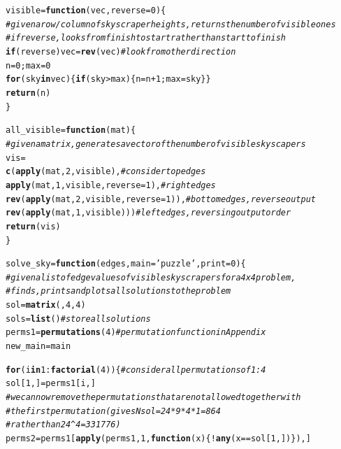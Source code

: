 \documentclass[12pt]{article}\usepackage[]{graphicx}\usepackage[]{color}
\makeatletter
\newcommand{\hlnum}[1]{\textcolor[rgb]{0.686,0.059,0.569}{#1}}%
\newcommand{\hlstr}[1]{\textcolor[rgb]{0.192,0.494,0.8}{#1}}%
\newcommand{\hlcom}[1]{\textcolor[rgb]{0.678,0.584,0.686}{\textit{#1}}}%
\newcommand{\hlopt}[1]{\textcolor[rgb]{0,0,0}{#1}}%
\newcommand{\hlstd}[1]{\textcolor[rgb]{0.345,0.345,0.345}{#1}}%
\newcommand{\hlkwa}[1]{\textcolor[rgb]{0.161,0.373,0.58}{\textbf{#1}}}%
\newcommand{\hlkwb}[1]{\textcolor[rgb]{0.69,0.353,0.396}{#1}}%
\newcommand{\hlkwc}[1]{\textcolor[rgb]{0.333,0.667,0.333}{#1}}%
\newcommand{\hlkwd}[1]{\textcolor[rgb]{0.737,0.353,0.396}{\textbf{#1}}}%
\newenvironment{kframe}{%
 \def\at@end@of@kframe{}%
 \ifinner\ifhmode%
  \def\at@end@of@kframe{\end{minipage}}%
  \begin{minipage}{\columnwidth}%
 \fi\fi%
 \def\FrameCommand##1{\hskip\@totalleftmargin \hskip-\fboxsep
 \colorbox{shadecolor}{##1}\hskip-\fboxsep
     \hskip-\linewidth \hskip-\@totalleftmargin \hskip\columnwidth}%
 \MakeFramed {\advance\hsize-\width
   \@totalleftmargin\z@ \linewidth\hsize
   \@setminipage}}%
 {\par\unskip\endMakeFramed%
 \at@end@of@kframe}
\newenvironment{knitrout}{}{} %
\makeatother
\begin{document}
\begin{knitrout}
\color{fgcolor}\begin{kframe}
\begin{alltt}
\hlstd{visible} \hlkwb{=} \hlkwa{function}\hlstd{(}\hlkwc{vec}\hlstd{,} \hlkwc{reverse} \hlstd{=} \hlnum{0}\hlstd{)\{}
  \hlcom{#given a row/column of skyscraper heights, returns the number of visible ones}
  \hlcom{#if reverse, looks from finish to start rather than start to finish}
  \hlkwa{if} \hlstd{(reverse) vec} \hlkwb{=} \hlkwd{rev}\hlstd{(vec)} \hlcom{#look from other direction}
  \hlstd{n} \hlkwb{=} \hlnum{0}\hlstd{; max} \hlkwb{=} \hlnum{0}
  \hlkwa{for} \hlstd{(sky} \hlkwa{in} \hlstd{vec)\{} \hlkwa{if} \hlstd{(sky} \hlopt{>} \hlstd{max)\{ n} \hlkwb{=} \hlstd{n}\hlopt{+}\hlnum{1}\hlstd{; max} \hlkwb{=} \hlstd{sky \} \}}
  \hlkwd{return}\hlstd{(n)}
\hlstd{\}}

\hlstd{all_visible} \hlkwb{=} \hlkwa{function}\hlstd{(}\hlkwc{mat}\hlstd{)\{}
  \hlcom{#given a matrix, generates a vector of the number of visible skyscapers}
  \hlstd{vis} \hlkwb{=}
    \hlkwd{c}\hlstd{(}\hlkwd{apply}\hlstd{(mat,} \hlnum{2}\hlstd{, visible),} \hlcom{#consider top edges}
    \hlkwd{apply}\hlstd{(mat,} \hlnum{1}\hlstd{, visible,} \hlkwc{reverse} \hlstd{=} \hlnum{1}\hlstd{),} \hlcom{#right edges}
    \hlkwd{rev}\hlstd{(}\hlkwd{apply}\hlstd{(mat,} \hlnum{2}\hlstd{, visible,} \hlkwc{reverse} \hlstd{=} \hlnum{1}\hlstd{)),} \hlcom{#bottom edges, reverse output}
    \hlkwd{rev}\hlstd{(}\hlkwd{apply}\hlstd{(mat,} \hlnum{1}\hlstd{, visible)))} \hlcom{#left edges, reversing output order}
  \hlkwd{return}\hlstd{(vis)}
\hlstd{\}}

\hlstd{solve_sky} \hlkwb{=} \hlkwa{function}\hlstd{(}\hlkwc{edges}\hlstd{,}\hlkwc{main} \hlstd{=} \hlstr{'puzzle'}\hlstd{,} \hlkwc{print}\hlstd{=}\hlnum{0}\hlstd{)\{}
  \hlcom{#given a list of edge values of visible skyscrapers for a 4x4 problem,}
  \hlcom{#finds, prints and plots all solutions to the problem}
  \hlstd{sol} \hlkwb{=} \hlkwd{matrix}\hlstd{(,}\hlnum{4}\hlstd{,}\hlnum{4}\hlstd{)}
  \hlstd{sols} \hlkwb{=} \hlkwd{list}\hlstd{()} \hlcom{#store all solutions}
  \hlstd{perms1} \hlkwb{=} \hlkwd{permutations}\hlstd{(}\hlnum{4}\hlstd{)} \hlcom{#permutation function in Appendix}
  \hlstd{new_main} \hlkwb{=} \hlstd{main}

  \hlkwa{for} \hlstd{(i} \hlkwa{in} \hlnum{1}\hlopt{:}\hlkwd{factorial}\hlstd{(}\hlnum{4}\hlstd{))\{} \hlcom{#consider all permutations of 1:4}
    \hlstd{sol[}\hlnum{1}\hlstd{,]} \hlkwb{=} \hlstd{perms1[i,]}
    \hlcom{#we can now remove the permutations that are not allowed together with}
    \hlcom{#the first permutation (gives Nsol = 24*9*4*1 = 864}
      \hlcom{#rather than 24^4 = 331776)}
    \hlstd{perms2} \hlkwb{=} \hlstd{perms1[}\hlkwd{apply}\hlstd{(perms1,} \hlnum{1}\hlstd{,} \hlkwa{function}\hlstd{(}\hlkwc{x}\hlstd{)\{} \hlopt{!}\hlkwd{any}\hlstd{(x} \hlopt{==} \hlstd{sol[}\hlnum{1}\hlstd{,]) \}), ]}


\end{alltt}
\end{kframe}
\end{knitrout}
\end{document}
